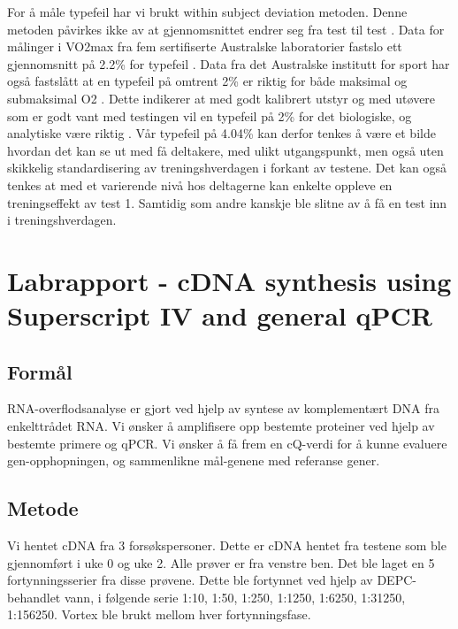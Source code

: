 \documentclass[
]{book}
\begin{document}
For å måle typefeil har vi brukt within subject deviation metoden. Denne metoden påvirkes ikke av at gjennomsnittet endrer seg fra test til test \citep{hopkins2000}. Data for målinger i VO2max fra fem sertifiserte Australske laboratorier fastslo ett gjennomsnitt på 2.2\% for typefeil \citep{halperin2015}. Data fra det Australske institutt for sport har også fastslått at en typefeil på omtrent 2\% er riktig for både maksimal og submaksimal O2 \citep{clark2007, robertson2010, saunders2009}. Dette indikerer at med godt kalibrert utstyr og med utøvere som er godt vant med testingen vil en typefeil på 2\% for det biologiske, og analytiske være riktig \citep{halperin2015}. Vår typefeil på 4.04\% kan derfor tenkes å være et bilde hvordan det kan se ut med få deltakere, med ulikt utgangspunkt, men også uten skikkelig standardisering av treningshverdagen i forkant av testene. Det kan også tenkes at med et varierende nivå hos deltagerne kan enkelte oppleve en treningseffekt av test 1. Samtidig som andre kanskje ble slitne av å få en test inn i treningshverdagen.

\hypertarget{labrapport---cdna-synthesis-using-superscript-iv-and-general-qpcr}{%
\chapter{Labrapport - cDNA synthesis using Superscript IV and general qPCR}\label{labrapport---cdna-synthesis-using-superscript-iv-and-general-qpcr}}

\hypertarget{formuxe5l}{%
\section{Formål}\label{formuxe5l}}

RNA-overflodsanalyse er gjort ved hjelp av syntese av komplementært DNA fra enkelttrådet RNA. Vi ønsker å amplifisere opp bestemte proteiner ved hjelp av bestemte primere og qPCR. Vi ønsker å få frem en cQ-verdi for å kunne evaluere gen-opphopningen, og sammenlikne mål-genene med referanse gener.

\hypertarget{metode-1}{%
\section{Metode}\label{metode-1}}

Vi hentet cDNA fra 3 forsøkspersoner. Dette er cDNA hentet fra testene som ble gjennomført i uke 0 og uke 2. Alle prøver er fra venstre ben. Det ble laget en 5 fortynningsserier fra disse prøvene. Dette ble fortynnet ved hjelp av DEPC-behandlet vann, i følgende serie 1:10, 1:50, 1:250, 1:1250, 1:6250, 1:31250, 1:156250. Vortex ble brukt mellom hver fortynningsfase.
\end{document}
